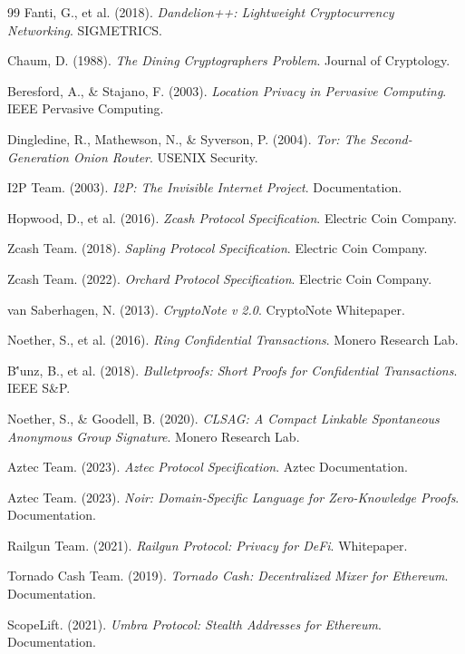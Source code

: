 \documentclass[11pt,a4paper,twoside]{book}
\begin{document}
\begin{thebibliography}{99}
 Fanti, G., et al. (2018). \textit{Dandelion++: Lightweight Cryptocurrency Networking}. SIGMETRICS.

 Chaum, D. (1988). \textit{The Dining Cryptographers Problem}. Journal of Cryptology.

 Beresford, A., \& Stajano, F. (2003). \textit{Location Privacy in Pervasive Computing}. IEEE Pervasive Computing.

 Dingledine, R., Mathewson, N., \& Syverson, P. (2004). \textit{Tor: The Second-Generation Onion Router}. USENIX Security.

 I2P Team. (2003). \textit{I2P: The Invisible Internet Project}. Documentation.


 Hopwood, D., et al. (2016). \textit{Zcash Protocol Specification}. Electric Coin Company.

 Zcash Team. (2018). \textit{Sapling Protocol Specification}. Electric Coin Company.

 Zcash Team. (2022). \textit{Orchard Protocol Specification}. Electric Coin Company.

 van Saberhagen, N. (2013). \textit{CryptoNote v 2.0}. CryptoNote Whitepaper.

 Noether, S., et al. (2016). \textit{Ring Confidential Transactions}. Monero Research Lab.

 B\''unz, B., et al. (2018). \textit{Bulletproofs: Short Proofs for Confidential Transactions}. IEEE S\&P.

 Noether, S., \& Goodell, B. (2020). \textit{CLSAG: A Compact Linkable Spontaneous Anonymous Group Signature}. Monero Research Lab.

 Aztec Team. (2023). \textit{Aztec Protocol Specification}. Aztec Documentation.

 Aztec Team. (2023). \textit{Noir: Domain-Specific Language for Zero-Knowledge Proofs}. Documentation.

 Railgun Team. (2021). \textit{Railgun Protocol: Privacy for DeFi}. Whitepaper.

 Tornado Cash Team. (2019). \textit{Tornado Cash: Decentralized Mixer for Ethereum}. Documentation.

 ScopeLift. (2021). \textit{Umbra Protocol: Stealth Addresses for Ethereum}. Documentation.


\end{thebibliography}
\end{document}
